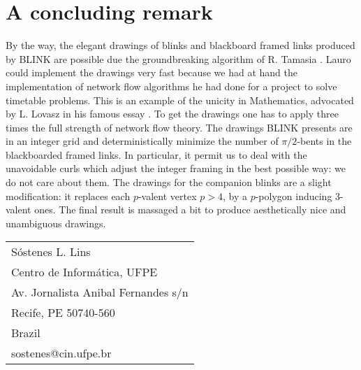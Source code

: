 
\section{A concluding remark}
By the way, the elegant drawings of blinks and blackboard framed links produced by BLINK are 
possible due the groundbreaking algorithm of R. Tamasia \cite{tamassia1987egg}.
Lauro could implement the drawings very fast because we had at hand the implementation of
network flow algorithms he had done for a project to solve timetable problems.
This is an example of the unicity in Mathematics, advocated by L. Lovasz in his famous essay \cite{lovasz1998om}.
To get the drawings one has to apply three times the full strength of network flow theory.
The drawings BLINK presents are in an integer grid and 
deterministically minimize the number of $\pi/2$-bents in the blackboarded framed links.
In particular, it permit us to deal with the unavoidable curls which adjust the integer framing in
the best possible way: we do not care about them. 
The drawings for the companion blinks are a slight modification: it replaces each $p$-valent vertex $p>4$,
by a $p$-polygon inducing 3-valent ones. The final result is massaged a bit to
produce aesthetically nice and unambiguous drawings.



%
%

%


\vspace{5mm}
\begin{center}
\hspace{7mm}
\begin{tabular}{l}
   S\'ostenes L. Lins\\
   Centro de Inform\'atica, UFPE \\
   Av. Jornalista Anibal Fernandes s/n\\
   Recife, PE 50740-560 \\
   Brazil\\
   sostenes@cin.ufpe.br
\end{tabular}
\end{center}
